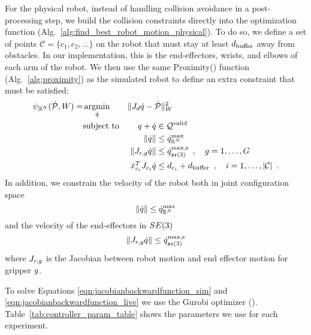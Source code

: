For the physical robot, instead of handling collision avoidance in a post-processing step, we build the collision constraints directly into the optimization function (Alg.~\ref{alg:find_best_robot_motion_physical}). To do so, we define a set of points  $\mathcal{C} = \{c_1, c_2, \dots \}$ on the robot that must stay at least $d_\textrm{buffer}$ away from obstacles. In our implementation, this is the end-effectors, wrists, and elbows of each arm of the robot. We then use the same Proximity() function (Alg.~\ref{alg:proximity}) as the simulated robot to define an extra constraint that must be satisfied:
\begin{equation}
\begin{aligned}
    \DeformBackwardFn_{\reals^N}(\deformvel, \Pinvweight) = 
        &\argmin_{\robotvel}    & & \| J_d \grippervel - \deformvel \|^2_{\Pinvweight} \\
        &\text{subject to}      & & \hspace{1.2cm} \llap{$\robotconfig + \robotvel$} \in \robotCvalid \\
        &                       & & \hspace{1.2cm} \llap{$\| \robotvel \|$}          \leq \physrobotvelmax \\
        &                       & & \hspace{1.2cm} \llap{$\| J_{r,\gripperidx} \robotvel \|$}  \leq \grippervelmaxservo \enspace , \quad g = 1, \dots, \ngrippers \\
        &                       & & \hspace{1.2cm} \llap{$\dot x_{c_i}^T J_{c_i} \grippervel$} \leq d_{c_i} + \dbuffer \enspace , \quad i = 1, \dots, |\mathcal{C}| \enspace .
\label{eqn:jacobianbackwardfunction_live}
\end{aligned}
\end{equation}
In addition, we constrain the velocity of the robot both in joint configuration space 
$$ \| \dot{q} \| \leq \dot{q}^\textrm{max}_{\mathbb{R}^N} $$
and the velocity of the end-effectors in $SE(3)$ 
$$ \| J_{r,g} \dot{q} \| \leq \dot{q}^\textrm{max,s}_{\mathfrak{se}(3)} $$
where $J_{r,g}$ is the Jacobian between robot motion and end effector motion for gripper $g$.

To solve Equations \eqref{eqn:jacobianbackwardfunction_sim} and \eqref{eqn:jacobianbackwardfunction_live} we use the Gurobi optimizer (\cite{Gurobi2016}). Table~\ref{tab:controller_param_table} shows the parameters we use for each experiment.


